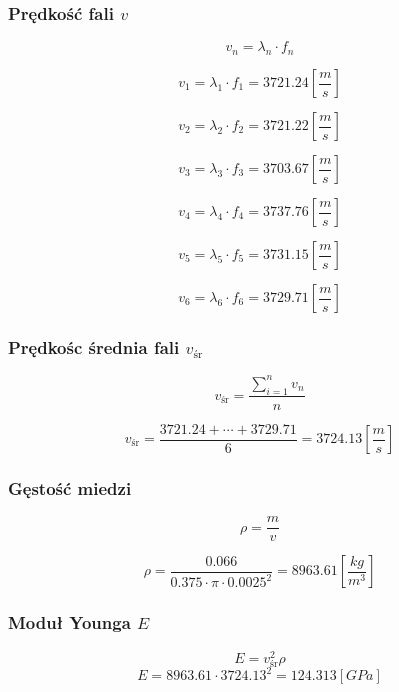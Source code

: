 \documentclass[a4paper,11pt]{article}
\begin{document}
 \subsubsection{Prędkość fali $v$}
 \begin{equation}
v_{n} = \lambda_{n} \cdot f_{n}
\end{equation}

$$v_{1} = \lambda_{1} \cdot f_{1} = 3721.24 \left[\frac{m}{s}\right]$$

$$v_{2} = \lambda_{2} \cdot f_{2} = 3721.22 \left[\frac{m}{s}\right]$$

$$v_{3} = \lambda_{3} \cdot f_{3} = 3703.67 \left[\frac{m}{s}\right]$$

$$v_{4} = \lambda_{4} \cdot f_{4} = 3737.76 \left[\frac{m}{s}\right]$$

$$v_{5} = \lambda_{5} \cdot f_{5} = 3731.15 \left[\frac{m}{s}\right]$$

$$v_{6} = \lambda_{6} \cdot f_{6} = 3729.71 \left[\frac{m}{s}\right]$$

\subsubsection{Prędkośc średnia fali $v_{\text{śr}}$}
$$ v_{\text{śr}} = \frac{\sum^{n}_{i=1}v_{n}}{n}$$

$$ v_{\text{śr}} = \frac{3721.24 + \cdots + 3729.71}{6} = 3724.13 \left[\frac{m}{s}\right] $$

\subsubsection{Gęstość miedzi}
\begin{equation}
\rho = \frac{m}{v}
\end{equation}

$$\rho = \frac{0.066}{0.375 \cdot \pi \cdot 0.0025^2} = 8963.61 \left[\frac{kg}{m^3}\right]$$
\subsubsection{Moduł Younga $E$}
\begin{equation}
E = v_{\text{śr}}^2\rho 
\end{equation}
$$E = 8963.61 \cdot 3724.13^2 = 124.313 [GPa]$$
\end{document}
